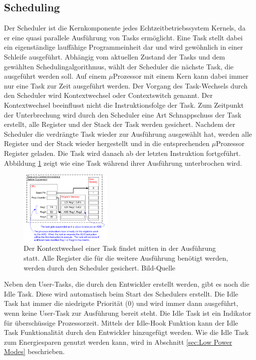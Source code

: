\subsection{Scheduling}
\label{Scheduling}
Der Scheduler ist die Kernkomponente jedes Echtzeitbetriebssystem Kernels, da er eine quasi parallele Aus\-füh\-rung von Tasks ermöglicht. Eine Task stellt dabei ein ei\-gen\-stän\-di\-ge lauffähige Programmeinheit dar und wird ge\-wöhn\-lich in einer Schleife ausgeführt. Abhängig vom aktuellen Zustand der Tasks und dem gewählten Schedulingalgorithmus, wählt der Scheduler die nächste Task, die ausgeführt werden soll. Auf einem $\mu$\-Pro\-zesso\-r mit einem Kern kann dabei immer nur eine Task zur Zeit ausgeführt werden. Der Vorgang des Task-Wechsels durch den Scheduler wird Kontextwechsel oder Contextswitch genannt. Der Kontextwechsel beeinflusst nicht die Instruktionsfolge der Task. Zum Zeitpunkt der Unterbrechung wird durch den Scheduler eine Art Schnappschuss der Task erstellt, alle Register und der Stack der Task werden gesichert. Nachdem der Scheduler die verdrängte Task wieder zur Ausführung ausgewählt hat, werden alle Register und der Stack wieder hergestellt und in die entsprechenden $\mu$\-Pro\-zesso\-r Register geladen. Die Task wird danach ab der letzten Instruktion fortgeführt. Abbildung \ref{fig:ContextSwitch} zeigt wie eine Task während ihrer Ausführung unterbrochen wird.
\begin{figure}[ht!]
	\centering
		\includegraphics[width=0.4\textwidth]{Pictures/FreeRTOSOrg/ExeContext.png}
	\caption{Der Kontextwechsel einer Task findet mitten in der Ausführung statt. Alle Register die für die weitere Ausführung benötigt werden, werden durch den Scheduler gesichert. Bild-Quelle~\protect{} }
	\label{fig:ContextSwitch}
\end{figure}
\newline
Neben den User-Tasks, die durch den Entwickler erstellt werden, gibt es noch die Idle Task. Diese wird automatisch beim Start des Schedulers erstellt. Die Idle Task hat immer die niedrigste Priorität (0) und wird immer dann ausgeführt, wenn keine User-Task zur Ausführung bereit steht. Die Idle Task ist ein Indikator für über\-schüss\-ige Prozessorzeit. Mittels der Idle-Hook Funktion kann der Idle Task Funktionalität durch den Entwickler hinzugefügt werden. Wie die Idle Task zum Energiesparen genutzt werden kann, wird in Abschnitt \ref{sec:Low Power Modes} beschrieben.
